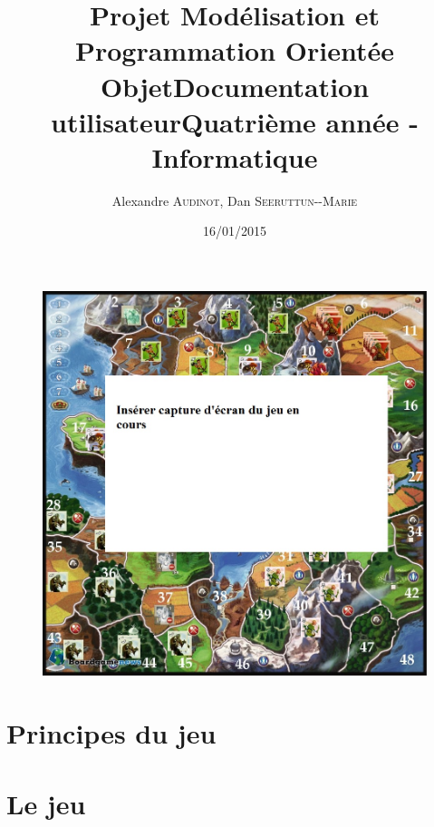 \documentclass[12pt]{article}
\title{Projet Modélisation et Programmation Orientée Objet\smallbreak Documentation utilisateur\smallbreak Quatrième année - Informatique }
\author{Alexandre \textsc{Audinot},  Dan \textsc{Seeruttun-{}-Marie}}
\date{16/01/2015}
\begin{document}
\maketitle

\begin{figure}[!h] 
\centerline{\includegraphics[scale=0.30]{img/cover.jpg}}
\end{figure}
\newpage


\section{Principes du jeu}

\newpage
\section{Le jeu}

\end{document}
